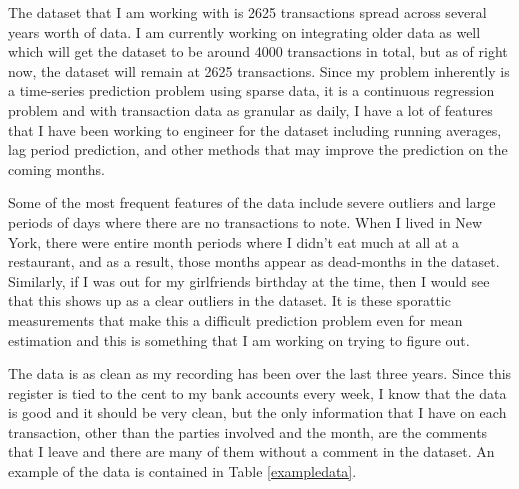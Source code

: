 \documentclass[11pt,a4paper]{article}
\newenvironment{updatematerial}{
\color{blue}
}{

}
\begin{document}
\begin{updatematerial}
	The dataset that I am working with is 2625 transactions spread across several years worth of data. I am currently working on integrating older data as well which will get the dataset to be around 4000 transactions in total, but as of right now, the dataset will remain at 2625 transactions. Since my problem inherently is a time-series prediction problem using sparse data, it is a continuous regression problem and with transaction data as granular as daily, I have a lot of features that I have been working to engineer for the dataset including running averages, lag period prediction, and other methods that may improve the prediction on the coming months.
	
	Some of the most frequent features of the data include severe outliers and large periods of days where there are no transactions to note. When I lived in New York, there were entire month periods where I didn't eat much at all at a restaurant, and as a result, those months appear as dead-months in the dataset. Similarly, if I was out for my girlfriends birthday at the time, then I would see that this shows up as a clear outliers in the dataset. It is these sporattic measurements that make this a difficult prediction problem even for mean estimation and this is something that I am working on trying to figure out. 
	
	The data is as clean as my recording has been over the last three years. Since this register is tied to the cent to my bank accounts every week, I know that the data is good and it should be very clean, but the only information that I have on each transaction, other than the parties involved and the month, are the comments that I leave and there are many of them without a comment in the dataset. An example of the data is contained in Table \ref{exampledata}.
	\begin{table}
		\caption{Three Data points from the data set}
		\label{exampledata}
	\end{table}
	

\end{updatematerial}
\end{document}
